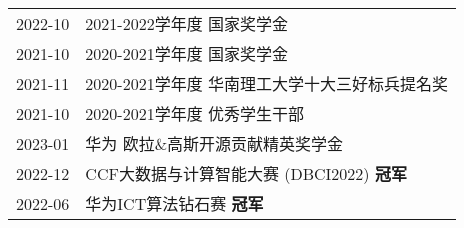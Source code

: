 %
%




\begin{tabular}{rl}	
	2022-10 & 2021-2022学年度 \enspace 国家奖学金 \\
	2021-10 & 2020-2021学年度 \enspace 国家奖学金 \\
	2021-11 & 2020-2021学年度 \enspace 华南理工大学十大三好标兵提名奖 \\
	2021-10 & 2020-2021学年度 \enspace 优秀学生干部  \vspace{0.5em} \\
	2023-01 & 华为 \enspace 欧拉\&高斯开源贡献精英奖学金 \\

	2022-12 & CCF大数据与计算智能大赛 (DBCI2022) \enspace \textbf{冠军} \\
	2022-06 & 华为ICT算法钻石赛 \enspace \textbf{冠军} \\


\end{tabular}
